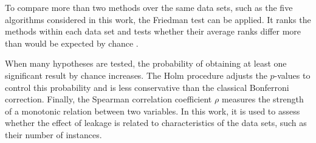 To compare more than two methods over the same data sets, such as the five
algorithms considered in this work, the Friedman test \cite{friedman1937} can be
applied. It ranks the methods within each data set and tests whether their
average ranks differ more than would be expected by chance \cite{demsar2006}.

When many hypotheses are tested, the probability of obtaining at least one
significant result by chance increases. The Holm procedure \cite{holm1979}
adjusts the $p$-values to control this probability and is less conservative than
the classical Bonferroni correction. Finally, the Spearman correlation
coefficient $\rho$ \cite{spearman1904} measures the strength of a monotonic
relation between two variables. In this work, it is used to assess whether the
effect of leakage is related to characteristics of the data sets, such as their
number of instances.
